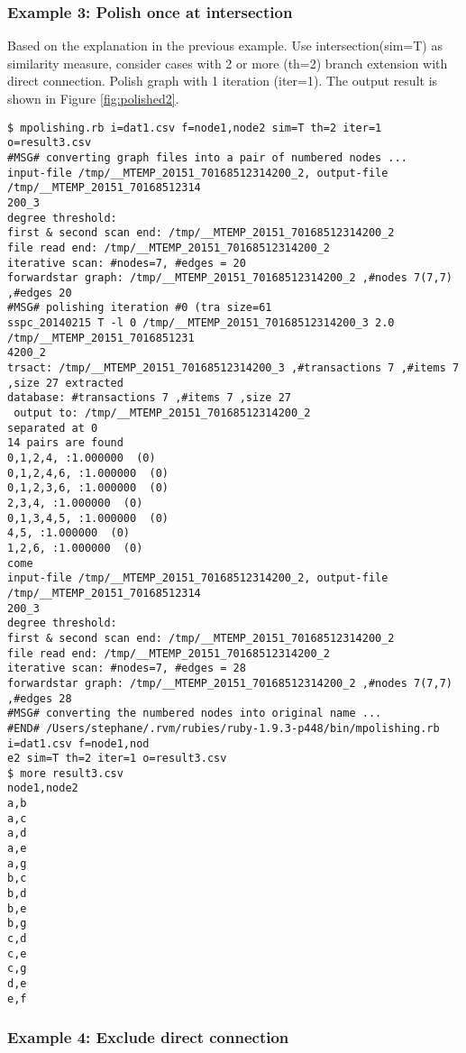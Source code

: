 \subsubsection*{Example 3: Polish once at intersection}

Based on the explanation in the previous example. Use intersection(sim=T) as similarity measure, consider cases with 2 or more (th=2) branch extension with direct connection. Polish graph with 1 iteration (iter=1).
The output result is shown in Figure \ref{fig:polished2}.



\begin{Verbatim}[baselinestretch=0.7,frame=single]
$ mpolishing.rb i=dat1.csv f=node1,node2 sim=T th=2 iter=1 o=result3.csv
#MSG# converting graph files into a pair of numbered nodes ...
input-file /tmp/__MTEMP_20151_70168512314200_2, output-file /tmp/__MTEMP_20151_70168512314
200_3
degree threshold: 
first & second scan end: /tmp/__MTEMP_20151_70168512314200_2
file read end: /tmp/__MTEMP_20151_70168512314200_2
iterative scan: #nodes=7, #edges = 20
forwardstar graph: /tmp/__MTEMP_20151_70168512314200_2 ,#nodes 7(7,7) ,#edges 20
#MSG# polishing iteration #0 (tra size=61
sspc_20140215 T -l 0 /tmp/__MTEMP_20151_70168512314200_3 2.0 /tmp/__MTEMP_20151_7016851231
4200_2
trsact: /tmp/__MTEMP_20151_70168512314200_3 ,#transactions 7 ,#items 7 ,size 27 extracted 
database: #transactions 7 ,#items 7 ,size 27
 output to: /tmp/__MTEMP_20151_70168512314200_2
separated at 0
14 pairs are found
0,1,2,4, :1.000000  (0)
0,1,2,4,6, :1.000000  (0)
0,1,2,3,6, :1.000000  (0)
2,3,4, :1.000000  (0)
0,1,3,4,5, :1.000000  (0)
4,5, :1.000000  (0)
1,2,6, :1.000000  (0)
come
input-file /tmp/__MTEMP_20151_70168512314200_2, output-file /tmp/__MTEMP_20151_70168512314
200_3
degree threshold: 
first & second scan end: /tmp/__MTEMP_20151_70168512314200_2
file read end: /tmp/__MTEMP_20151_70168512314200_2
iterative scan: #nodes=7, #edges = 28
forwardstar graph: /tmp/__MTEMP_20151_70168512314200_2 ,#nodes 7(7,7) ,#edges 28
#MSG# converting the numbered nodes into original name ...
#END# /Users/stephane/.rvm/rubies/ruby-1.9.3-p448/bin/mpolishing.rb i=dat1.csv f=node1,nod
e2 sim=T th=2 iter=1 o=result3.csv
$ more result3.csv
node1,node2
a,b
a,c
a,d
a,e
a,g
b,c
b,d
b,e
b,g
c,d
c,e
c,g
d,e
e,f
\end{Verbatim}
\subsubsection*{Example 4: Exclude direct connection}

